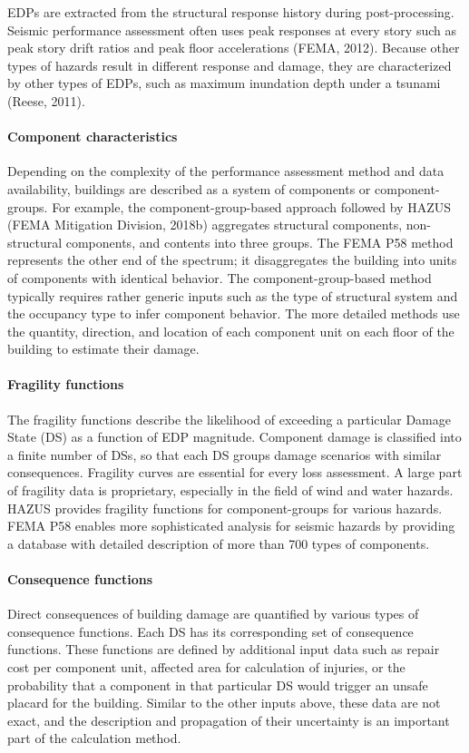 EDPs are extracted from the structural response history during post-processing. Seismic performance assessment often uses peak responses at every story such as peak story drift ratios and peak floor accelerations (FEMA, 2012). Because other types of hazards result in different response and damage, they are characterized by other types of EDPs, such as maximum inundation depth under a tsunami (Reese, 2011). 

\paragraph{Component characteristics} Depending on the complexity of the performance assessment method and data availability, buildings are described as a system of components or component-groups. For example, the component-group-based approach followed by HAZUS (FEMA Mitigation Division, 2018b) aggregates structural components, non-structural components, and contents into three groups. The FEMA P58 method represents the other end of the spectrum; it disaggregates the building into units of components with identical behavior. The component-group-based method typically requires rather generic inputs such as the type of structural system and the occupancy type to infer component behavior. The more detailed methods use the quantity, direction, and location of each component unit on each floor of the building to estimate their damage.

\paragraph{Fragility functions} The fragility functions describe the likelihood of exceeding a particular Damage State (DS) as a function of EDP magnitude. Component damage is classified into a finite number of DSs, so that each DS groups damage scenarios with similar consequences. Fragility curves are essential for every loss assessment. A large part of fragility data is proprietary, especially in the field of wind and water hazards. HAZUS provides fragility functions for component-groups for various hazards. FEMA P58 enables more sophisticated analysis for seismic hazards by providing a database with detailed description of more than 700 types of components. 

\paragraph{Consequence functions} Direct consequences of building damage are quantified by various types of consequence functions. Each DS has its corresponding set of consequence functions. These functions are defined by additional input data such as repair cost per component unit, affected area for calculation of injuries, or the probability that a component in that particular DS would trigger an unsafe placard for the building. Similar to the other inputs above, these data are not exact, and the description and propagation of their uncertainty is an important part of the calculation method.

